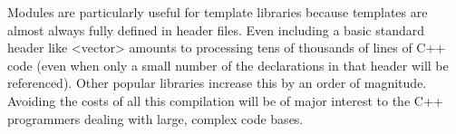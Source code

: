 Modules are particularly useful for template libraries because templates are almost always fully defined in header files. Even including a basic standard header like <vector> amounts to processing tens of thousands of lines of C++ code (even when only a small number of the declarations in that header will be referenced). Other popular libraries increase this by an order of magnitude. Avoiding the costs of all this compilation will be of major interest to the C++ programmers dealing with large, complex code bases.































